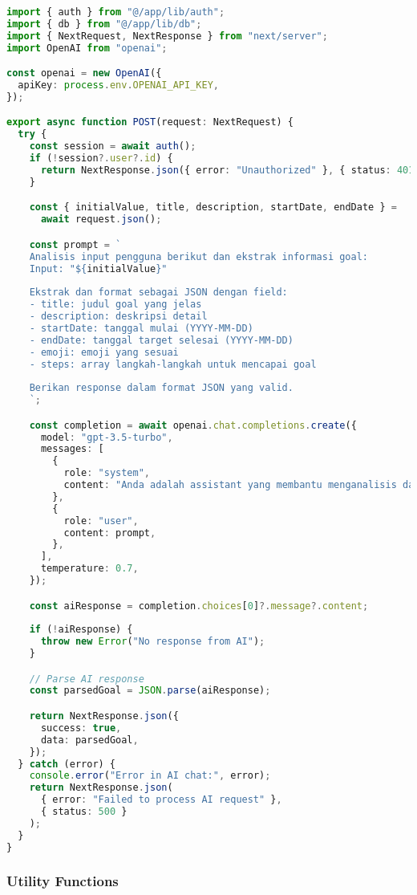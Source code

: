 \begin{lstlisting}[language=TypeScript, caption=app/api/ai-chat/route.ts - AI Goal Processing]
import { auth } from "@/app/lib/auth";
import { db } from "@/app/lib/db";
import { NextRequest, NextResponse } from "next/server";
import OpenAI from "openai";

const openai = new OpenAI({
  apiKey: process.env.OPENAI_API_KEY,
});

export async function POST(request: NextRequest) {
  try {
    const session = await auth();
    if (!session?.user?.id) {
      return NextResponse.json({ error: "Unauthorized" }, { status: 401 });
    }

    const { initialValue, title, description, startDate, endDate } = 
      await request.json();

    const prompt = `
    Analisis input pengguna berikut dan ekstrak informasi goal:
    Input: "${initialValue}"
    
    Ekstrak dan format sebagai JSON dengan field:
    - title: judul goal yang jelas
    - description: deskripsi detail
    - startDate: tanggal mulai (YYYY-MM-DD)
    - endDate: tanggal target selesai (YYYY-MM-DD)
    - emoji: emoji yang sesuai
    - steps: array langkah-langkah untuk mencapai goal
    
    Berikan response dalam format JSON yang valid.
    `;

    const completion = await openai.chat.completions.create({
      model: "gpt-3.5-turbo",
      messages: [
        {
          role: "system",
          content: "Anda adalah assistant yang membantu menganalisis dan memformat goal planning.",
        },
        {
          role: "user",
          content: prompt,
        },
      ],
      temperature: 0.7,
    });

    const aiResponse = completion.choices[0]?.message?.content;
    
    if (!aiResponse) {
      throw new Error("No response from AI");
    }

    // Parse AI response
    const parsedGoal = JSON.parse(aiResponse);

    return NextResponse.json({
      success: true,
      data: parsedGoal,
    });
  } catch (error) {
    console.error("Error in AI chat:", error);
    return NextResponse.json(
      { error: "Failed to process AI request" },
      { status: 500 }
    );
  }
}
\end{lstlisting}

\subsubsection{Utility Functions}

